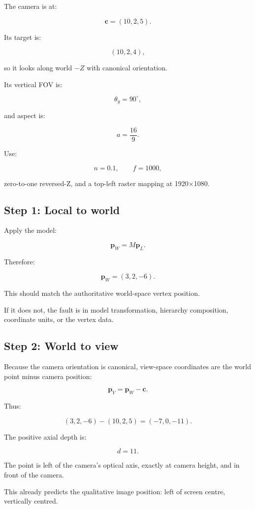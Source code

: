 The camera is at:

\[ \boxed{ \mathbf c=(10,2,5). } \]

Its target is:

\[ (10,2,4), \]

so it looks along world \(-Z\) with canonical orientation.

Its vertical FOV is:

\[ \theta_y=90^\circ, \]

and aspect is:

\[ a=\frac{16}{9}. \]

Use:

\[ n=0.1,\qquad f=1000, \]

zero-to-one reversed-Z, and a top-left raster mapping at 1920×1080.

\subsection{Step 1: Local to world}\label{02-foundations-ii-ch037-step-1-local-to-world}

Apply the model:

\[ \mathbf p_W=M\mathbf p_L. \]

Therefore:

\[ \boxed{ \mathbf p_W=(3,2,-6). } \]

This should match the authoritative world-space vertex position.

If it does not, the fault is in model transformation, hierarchy composition, coordinate units, or the vertex data.

\subsection{Step 2: World to view}\label{02-foundations-ii-ch037-step-2-world-to-view}

Because the camera orientation is canonical, view-space coordinates are the world point minus camera position:

\[ \mathbf p_V=\mathbf p_W-\mathbf c. \]

Thus:

\[ (3,2,-6)-(10,2,5) = \boxed{(-7,0,-11)}. \]

The positive axial depth is:

\[ \boxed{d=11}. \]

The point is left of the camera's optical axis, exactly at camera height, and in front of the camera.

This already predicts the qualitative image position: left of screen centre, vertically centred.

